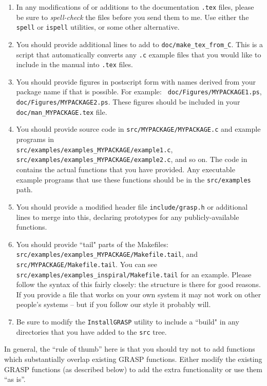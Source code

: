 \begin{enumerate}
\item
In any modifications of or additions to the documentation {\tt *.tex} files, please be sure to
{\it spell-check} the files before you send them to me.  Use either the {\tt spell}
or {\tt ispell} utilities, or some other alternative.
\item
You should provide additional lines to add to {\tt doc/make\_tex\_from\_C}.
    This is a script that automatically converts any {\tt *.c} example files
    that you would like to include in the manual into {\tt .tex} files.
\item
You should provide figures in postscript form with names derived from
    your package name if that is possible.  For example: {\tt
    doc/Figures/MYPACKAGE1.ps},
    {\tt doc/Figures/MYPACKAGE2.ps}.  These figures should be included in your
    {\tt doc/man\_MYPACKAGE.tex} file.
\item
You should provide source code in {\tt src/MYPACKAGE/MYPACKAGE.c} and
    example programs in\\
    {\tt src/examples/examples\_MYPACKAGE/example1.c},\\
    {\tt src/examples/examples\_MYPACKAGE/example2.c}, and so on.  The code
    in  contains the actual functions that
    you have provided.  Any executable example programs that use these
    functions should be in the {\tt src/examples} path.
\item
You should provide a modified header file {\tt include/grasp.h} or
additional lines to merge into this, declaring prototypes for any
publicly-available functions.
\item
You should provide ``tail" parts of the Makefiles:\\
    {\tt src/examples/examples\_MYPACKAGE/Makefile.tail}, and \\
    {\tt src/MYPACKAGE/Makefile.tail}.  You can see\\
    {\tt src/examples/examples\_inspiral/Makefile.tail} for an example.
    Please follow the syntax of this fairly closely: the structure is there for good
    reasons.  If you provide a file that works on your own system it may not
    work on other people's systems -- but if you follow our style it probably will.
\item
Be sure to modify the {\tt InstallGRASP} utility to include a ``build"
in any directories that you have added to the {\tt src} tree.
\end{enumerate}
In general, the ``rule of thumb'' here is that you should try not to
add functions which substantially overlap existing GRASP functions.
Either modify the existing GRASP functions (as described below) to add
the extra functionality or use them ``as is''.

